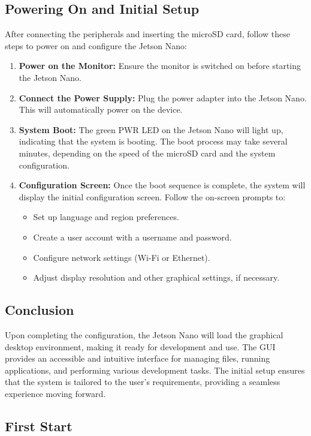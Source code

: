 \subsection{Powering On and Initial Setup}

After connecting the peripherals and inserting the microSD card, follow these steps to power on and configure the Jetson Nano:

\begin{enumerate}
	\item \textbf{Power on the Monitor:} Ensure the monitor is switched on before starting the Jetson Nano.
	\item \textbf{Connect the Power Supply:} Plug the power adapter into the Jetson Nano. This will automatically power on the device.
	\item \textbf{System Boot:} The green PWR LED on the Jetson Nano will light up, indicating that the system is booting. The boot process may take several minutes, depending on the speed of the microSD card and the system configuration.
	\item \textbf{Configuration Screen:} Once the boot sequence is complete, the system will display the initial configuration screen. Follow the on-screen prompts to:
	\begin{itemize}
		\item Set up language and region preferences.
		\item Create a user account with a username and password.
		\item Configure network settings (Wi-Fi or Ethernet).
		\item Adjust display resolution and other graphical settings, if necessary.
	\end{itemize}
\end{enumerate}

\subsection{Conclusion}

Upon completing the configuration, the Jetson Nano will load the graphical desktop environment, making it ready for development and use. The GUI provides an accessible and intuitive interface for managing files, running applications, and performing various development tasks. The initial setup ensures that the system is tailored to the user's requirements, providing a seamless experience moving forward.



\subsection{First Start}

